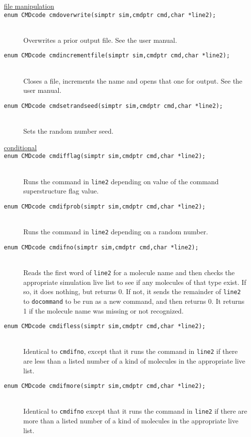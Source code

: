 \documentclass {scrbook}
\newcommand {\ttt} {\texttt}
\begin{document}
\begin{description}
\item[\underline{file manipulation}]

\item[\ttt{enum CMDcode cmdoverwrite(simptr sim,cmdptr cmd,char *line2);}]
\hfill \\
Overwrites a prior output file. See the user manual.

\item[\ttt{enum CMDcode cmdincrementfile(simptr sim,cmdptr cmd,char *line2);}]
\hfill \\
Closes a file, increments the name and opens that one for output. See the user manual.

\item[\ttt{enum CMDcode cmdsetrandseed(simptr sim,cmdptr cmd,char *line2);}]
\hfill \\
Sets the random number seed.

\item[\underline{conditional}]

\item[\ttt{enum CMDcode cmdifflag(simptr sim,cmdptr cmd,char *line2);}]
\hfill \\
Runs the command in \ttt{line2} depending on value of the command superstructure flag value.

\item[\ttt{enum CMDcode cmdifprob(simptr sim,cmdptr cmd,char *line2);}]
\hfill \\
Runs the command in \ttt{line2} depending on a random number.

\item[\ttt{enum CMDcode cmdifno(simptr sim,cmdptr cmd,char *line2);}]
\hfill \\
Reads the first word of \ttt{line2} for a molecule name and then checks the appropriate simulation live list to see if any molecules of that type exist. If so, it does nothing, but returns 0. If not, it sends the remainder of \ttt{line2} to \ttt{docommand} to be run as a new command, and then returns 0. It returns 1 if the molecule name was missing or not recognized.

\item[\ttt{enum CMDcode cmdifless(simptr sim,cmdptr cmd,char *line2);}]
\hfill \\
Identical to \ttt{cmdifno}, except that it runs the command in \ttt{line2} if there are less than a listed number of a kind of molecules in the appropriate live list.

\item[\ttt{enum CMDcode cmdifmore(simptr sim,cmdptr cmd,char *line2);}]
\hfill \\
Identical to \ttt{cmdifno} except that it runs the command in \ttt{line2} if there are more than a listed number of a kind of molecules in the appropriate live list.


\end{description}
\end{document}
